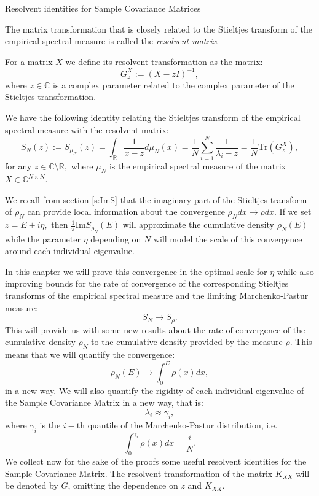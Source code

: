 \documentclass[11pt, a4paper, oneside]{book}
\numberwithin{equation}{chapter}
\newcommand{\beq}{\begin{equation}}
\newcommand{\eeq}{\end{equation}}
\begin{document}
\begin{section}{Resolvent identities for Sample Covariance Matrices} \label{s:Resol}

The matrix transformation that is closely related to the Stieltjes transform of the empirical spectral measure is called the \textit{resolvent matrix}.

For a matrix $X$ we define its resolvent transformation as the matrix:
\[
G_z^X := (X - zI)^{-1},
\]
where $z \in \mathbb{C}$ is a complex parameter related to the complex parameter of the Stieltjes transformation.

We have the following identity relating the Stieltjes transform of the empirical spectral measure with the resolvent matrix:
%
\beq \label{TrG}
S_{N}(z) := S_{\mu_N}(z) = \int_{\mathbb{R}} \frac{1}{x-z}d\mu_N(x) = \frac{1}{N} \sum \limits_{i=1}^N \frac{1}{\lambda_i - z} = \frac{1}{N} \mathrm{Tr} (G_z^X),
\eeq
for any $z \in \mathbb{C} \setminus \mathbb{R},$ where $\mu_N$ is the empirical spectral measure of the matrix $X\in \mathbb{C}^{N \times N}.$

We recall from section \ref{s:ImS} that the imaginary part of the Stieltjes transform of $\rho_N$ can provide local information about the convergence $\rho_N dx \to \rho dx.$ If we set $z=E+i\eta,$ then $\frac{1}{\pi} \mathrm{Im} S_{\rho_N} (E)$ will approximate the cumulative density $\rho_N(E)$ while the parameter $\eta$ depending on $N$ will model the scale of this convergence around each individual eigenvalue.

In this chapter we will prove this convergence in the optimal scale for $\eta$ while also improving bounds for the rate of convergence of the corresponding Stieltjes transforms of the empirical spectral measure and the limiting Marchenko-Pastur measure:
%
\[
S_N \to S_{\rho} .
\]
%
This will provide us with some new results about the rate of convergence of the cumulative density $\rho_N$ to the cumulative density provided by the measure $\rho.$ This means that we will quantify the convergence:
%
\beq \label{counting}
\rho_N(E) \to \int_{0}^E \rho(x) dx ,
\eeq
%
in a new way. We will also quantify the rigidity of each individual eigenvalue of the Sample Covariance Matrix in a new way, that is:
%
\beq
\lambda_i \approx \gamma_i ,
\eeq
%
where $\gamma_i$ is the $i-$th quantile of the Marchenko-Pastur distribution, i.e.
%
\beq \label{quantile}
\int_0^{\gamma_i} \rho(x) dx = \frac{i}{N}.
\eeq
%
We collect now for the sake of the proofs some useful resolvent identities for the Sample Covariance Matrix. The resolvent transformation of the matrix $K_{XX}$ will be denoted by $G$, omitting the dependence on $z$ and $K_{XX}.$


\end{section}
\end{document}
